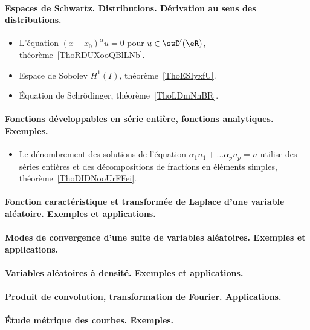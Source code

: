 \paragraph{Espaces de Schwartz. Distributions. Dérivation au sens des distributions.}
\begin{itemize}
    \item L'équation \( (x-x_0)^{\alpha}u=0\) pour \( u\in\swD'(\eR)\), théorème~\ref{ThoRDUXooQBlLNb}.
    \item Espace de Sobolev \( H^1(I)\), théorème~\ref{ThoESIyxfU}.
    \item Équation de Schrödinger, théorème~\ref{ThoLDmNnBR}.
\end{itemize}

\paragraph{Fonctions développables en série entière, fonctions analytiques. Exemples.}
\begin{itemize}
    \item Le dénombrement des solutions de l'équation \( \alpha_1 n_1+\ldots \alpha_pn_p=n\) utilise des séries entières et des décompositions de fractions en éléments simples, théorème~\ref{ThoDIDNooUrFFei}.
\end{itemize}
\paragraph{Fonction caractéristique et transformée de Laplace d'une variable aléatoire. Exemples et applications.}
\paragraph{Modes de convergence d’une suite de variables aléatoires. Exemples et applications.}
\paragraph{Variables aléatoires à densité. Exemples et applications.}
\paragraph{Produit de convolution, transformation de Fourier. Applications.}
\paragraph{Étude métrique des courbes. Exemples.}
